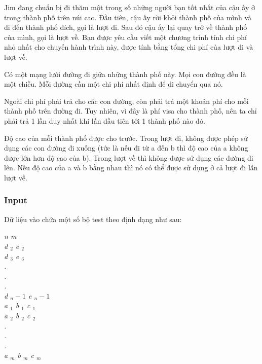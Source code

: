 







      Jim đang chuẩn bị đi thăm một trong số những người bạn tốt nhất của cậu ấy ở trong thành phố trên núi cao. Đầu tiên, cậu ấy rời khỏi thành phố của mình và đi đến thành phố đích, gọi là lượt đi. Sau đó cậu ấy lại quay trở về thành phố của mình, gọi là lượt về. Bạn được yêu cầu viết một chương trình tính chi phí nhỏ nhất cho chuyến hành trình này, được tính bằng tổng chi phí của lượt đi và lượt về.     

      Có một mạng lưới đường đi giữa những thành phố này. Mọi con đường đều là một chiều. Mỗi đường cần một chi phí nhất định để di chuyển qua nó.     

      Ngoài chi phí phải trả cho các con đường, còn phải trả một khoản phí cho mỗi thành phố trên đường đi. Tuy nhiên, vì đây là phí visa cho thành phố, nên ta chỉ phải trả 1 lần duy nhất khi lần đầu tiên tới 1 thành phố nào đó.     

      Độ cao của mỗi thành phố được cho trước. Trong lượt đi, không được phép sử dụng các con đường đi xuống (tức là nếu đi từ a đến b thì độ cao của a không được lớn hơn độ cao của b). Trong lượt về thì không được sử dụng các đường đi lên. Nếu độ cao của a và b bằng nhau thì nó có thể được sử dụng ở cả lượt đi lẫn lượt về.     

\subsubsection{      Input     }

      Dữ liệu vào chứa một số bộ test theo định dạng như sau:     

\emph{       n m       
\\       d       $_        2       $       e       $_        2       $
\\       d       $_        3       $       e       $_        3       $
\\       .       
\\       .       
\\       .       
\\       d       $_        n-1       $       e       $_        n-1       $
\\       a       $_        1       $       b       $_        1       $       c       $_        1       $
\\       a       $_        2       $       b       $_        2       $       c       $_        2       $
\\       .       
\\       .       
\\       .       
\\       a       $_        m       $       b       $_        m       $       c       $_        m       $}

